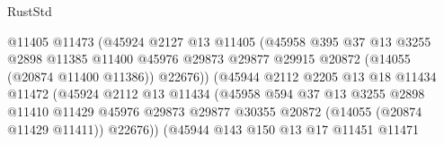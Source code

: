 \begin{lexlean}{RustStd}
\begin{coremodule}
                                      @11405
                                      @11473
                                      (@45924
                                        @2127
                                        @13
                                        @11405
                                        (@45958
                                          @395
                                          @37
                                          @13
                                          @3255
                                          @2898
                                          @11385
                                          @11400
                                          @45976
                                          @29873
                                          @29877
                                          @29915
                                          @20872
                                          (@14055 (@20874 @11400 @11386))
                                          @22676))
                                      (@45944
                                        @2112
                                        @2205
                                        @13
                                        @18
                                        @11434
                                        @11472
                                        (@45924
                                          @2112
                                          @13
                                          @11434
                                          (@45958
                                            @594
                                            @37
                                            @13
                                            @3255
                                            @2898
                                            @11410
                                            @11429
                                            @45976
                                            @29873
                                            @29877
                                            @30355
                                            @20872
                                            (@14055 (@20874 @11429 @11411))
                                            @22676))
                                        (@45944
                                          @143
                                          @150
                                          @13
                                          @17
                                          @11451
                                          @11471

\end{coremodule}
\end{lexlean}
